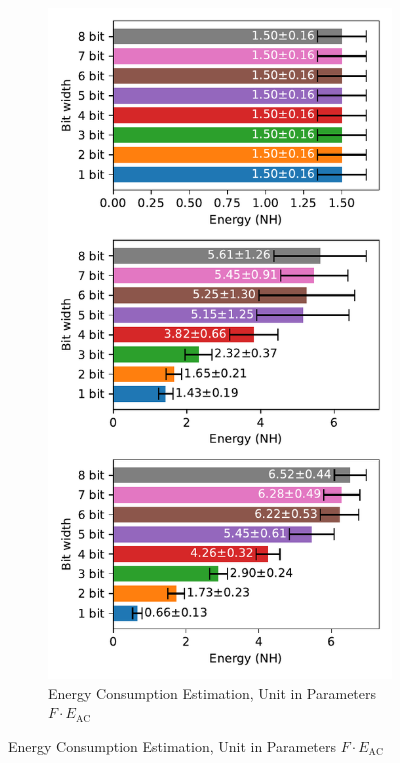        \begin{figure}[H]
            \centering
            \begin{subfigure}[H]{0.7\textwidth}
                \centering
                \includegraphics[width=\textwidth]{../standard/DVSGesture/plots/dvsgesture_test_energy_nh.pdf}
                \caption{Energy Consumption Estimation, Unit in Parameters $F\cdot E_{\text{AC}}$}
            \end{subfigure}
        \end{figure}
